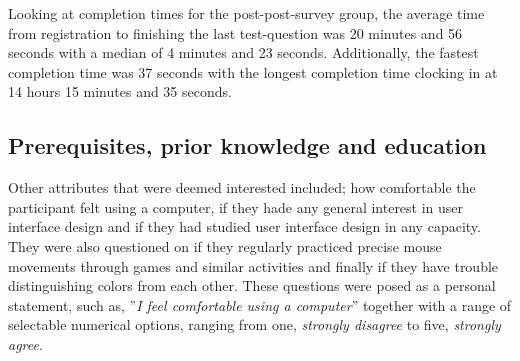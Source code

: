   Looking at completion times for the post-post-survey group, the average
  time from registration to finishing the last test-question was 20 minutes
  and 56 seconds with a median of 4 minutes and 23 seconds. Additionally,
  the fastest completion time was 37 seconds with the longest completion
  time clocking in at 14 hours 15 minutes and 35 seconds.

  \subsection{Prerequisites, prior knowledge and education}

  Other attributes that were deemed interested included; how comfortable
  the participant felt using a computer, if they hade any general interest
  in user interface design and if they had studied user interface design in
  any capacity. They were also questioned on if they regularly practiced
  precise mouse movements through games and similar activities and finally
  if they have trouble distinguishing colors from each other. These
  questions were posed as a personal statement, such as, ''\textit{I feel
    comfortable using a computer}'' together with a range of selectable
  numerical options, ranging from one, \textit{strongly disagree} to five,
  \textit{strongly agree}.

%
%



%
%
%
%
%
%
%


